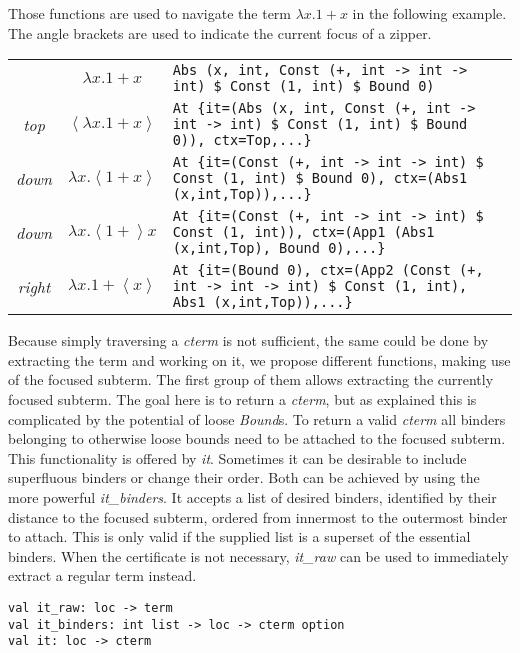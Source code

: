 \documentclass[12pt,a4paper]{article}
\newcommand{\type}[1]{\textit{#1}}
\newcommand{\constructor}[1]{\textit{#1}}
\newcommand{\function}[1]{\textit{#1}}
\newcommand{\inlineterm}[1]{\fontsize{8}{10}\texttt{#1}}
\begin{document}
Those functions are used to navigate the term \(\lambda{}x.1+x\) in the following example.
The angle brackets are used to indicate the current focus of a zipper.

\begin{tabularx}{\textwidth}{ccX}
&\(\lambda{}x.1+x\)&\inlineterm{Abs (x, int, Const (+, int -> int -> int) \$ Const (1, int) \$ Bound 0)}\\
\function{top}&\(\left\langle\lambda{}x.1+x\right\rangle\)&\inlineterm{At \{it=(Abs (x, int, Const (+, int -> int -> int) \$ Const (1, int) \$ Bound 0)), ctx=Top,...\}}\\
\function{down}&\(\lambda{}x. \left\langle 1+x \right\rangle \)&\inlineterm{At \{it=(Const (+, int -> int -> int) \$ Const (1, int) \$ Bound 0), ctx=(Abs1 (x,int,Top)),...\}}\\
\function{down}&\(\lambda{}x. \left\langle 1+ \right\rangle x \)&\inlineterm{At \{it=(Const (+, int -> int -> int) \$ Const (1, int)), ctx=(App1 (Abs1 (x,int,Top), Bound 0),...\}}\\
\function{right}&\(\lambda{}x. 1+ \left\langle x \right\rangle \)&\inlineterm{At \{it=(Bound 0), ctx=(App2 (Const (+, int -> int -> int) \$ Const (1, int), Abs1 (x,int,Top)),...\}}
\end{tabularx}

Because simply traversing a \type{cterm} is not sufficient, the same could be done by extracting the term and working on it, we propose different functions, making use of the focused subterm.
The first group of them allows extracting the currently focused subterm.
The goal here is to return a \type{cterm}, but as explained this is complicated by the potential of loose \constructor{Bound}s.
To return a valid \type{cterm} all binders belonging to otherwise loose bounds need to be attached to the focused subterm.
This functionality is offered by \function{it}.
Sometimes it can be desirable to include superfluous binders or change their order.
Both can be achieved by using the more powerful \function{it\_binders}.
It accepts a list of desired binders, identified by their distance to the focused subterm, ordered from innermost to the outermost binder to attach.
This is only valid if the supplied list is a superset of the essential binders.
When the certificate is not necessary, \type{it\_raw} can be used to immediately extract a regular term instead.

\begin{lstlisting}
val it_raw: loc -> term
val it_binders: int list -> loc -> cterm option
val it: loc -> cterm
\end{lstlisting}
\end{document}
